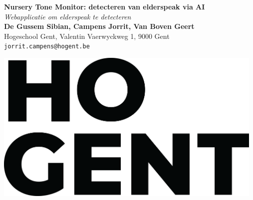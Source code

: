 \documentclass[a0,portrait]{a0poster}
\begin{document}


\begin{minipage}[t]{0.75\linewidth}
\VeryHuge \color{HoGentAccent1} \textbf{Nursery Tone Monitor: detecteren van \newline elderspeak via AI} \color{Black}\\ %
\Huge\textit{Webapplicatie om elderspeak te detecteren}\\[2.4cm] %
\huge \textbf{De Gussem Sibian, Campens Jorrit, Van Boven Geert}\\[0.5cm] %
\huge Hogeschool Gent, Valentin Vaerwyckweg 1, 9000 Gent\\[0.4cm] %
\Large \texttt{jorrit.campens@hogent.be} \\
\end{minipage}
%
\begin{minipage}[t]{0.30\linewidth}
\includegraphics[width=13cm,right]{figures/HOGENT_Logo_Pos_rgb.png}

\end{minipage}

\vspace{2cm} %

\end{document}
